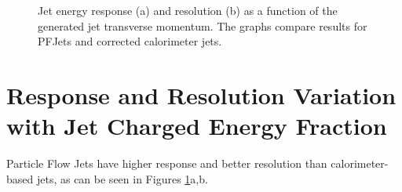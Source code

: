 \documentclass{cmspaper}
\begin{document}
\begin{figure}[tb]
\centering
{}
\caption{Jet energy response (a) and resolution (b) as a function of the generated jet transverse momentum. The graphs compare results for PFJets and corrected calorimeter jets. \label{fig:PF_vs_calo}}
\end{figure}



\section{Response and Resolution Variation with Jet Charged Energy Fraction}
\label{sec:MCtest}

Particle Flow Jets have higher response and better resolution than calorimeter-based jets, as can be seen in Figures \ref{fig:PF_vs_calo}a,b.
\end{document}
